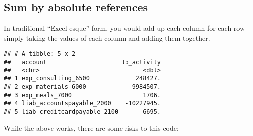 \documentclass[
]{book}
\newenvironment{Shaded}{\begin{snugshade}}{\end{snugshade}}
\newcommand{\DataTypeTok}[1]{\textcolor[rgb]{0.13,0.29,0.53}{#1}}
\newcommand{\DecValTok}[1]{\textcolor[rgb]{0.00,0.00,0.81}{#1}}
\newcommand{\KeywordTok}[1]{\textcolor[rgb]{0.13,0.29,0.53}{\textbf{#1}}}
\newcommand{\NormalTok}[1]{#1}
\newcommand{\OperatorTok}[1]{\textcolor[rgb]{0.81,0.36,0.00}{\textbf{#1}}}
\newcommand{\StringTok}[1]{\textcolor[rgb]{0.31,0.60,0.02}{#1}}
\begin{document}
\hypertarget{sum-by-absolute-references}{%
\subsection{Sum by absolute references}\label{sum-by-absolute-references}}

In traditional ``Excel-esque'' form, you would add up each column for each row - simply taking the values of each column and adding them together.

\begin{Shaded}
\end{Shaded}

\begin{verbatim}
## # A tibble: 5 x 2
##   account                     tb_activity
##   <chr>                             <dbl>
## 1 exp_consulting_6500             248427.
## 2 exp_materials_6000             9984507.
## 3 exp_meals_7000                    1706.
## 4 liab_accountspayable_2000    -10227945.
## 5 liab_creditcardpayable_2100      -6695.
\end{verbatim}

While the above works, there are some risks to this code:
\end{document}
